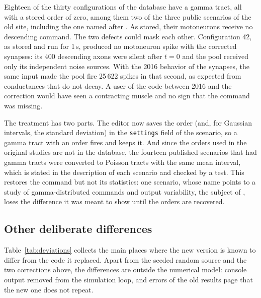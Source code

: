 \documentclass[pdflatex,sn-apa,iicol]{sn-jnl}
\providecommand{\code}[1]{\texttt{#1}}
\begin{document}
Eighteen of the thirty configurations of the database have a gamma tract, all with a stored order of zero, among them two of the three public scenarios of the old site, including the one named after \citet{Watanabe2015}. As stored, their motoneurons receive no descending command. The two defects could mask each other. Configuration 42, as stored and run for 1\,s, produced no motoneuron spike with the corrected synapses: its 400 descending axons were silent after $t = 0$ and the pool received only its independent noise sources. With the 2016 behavior of the synapses, the same input made the pool fire 25\,622 spikes in that second, as expected from conductances that do not decay. A user of the code between 2016 and the correction would have seen a contracting muscle and no sign that the command was missing.

The treatment has two parts. The editor now saves the order (and, for Gaussian intervals, the standard deviation) in the \code{settings} field of the scenario, so a gamma tract with an order fires and keeps it. And since the orders used in the original studies are not in the database, the fourteen published scenarios that had gamma tracts were converted to Poisson tracts with the same mean interval, which is stated in the description of each scenario and checked by a test. This restores the command but not its statistics: one scenario, whose name points to a study of gamma-distributed commands and output variability, the subject of \citet{Watanabe2013}, loses the difference it was meant to show until the orders are recovered.

\subsection{Other deliberate differences}\label{sec:deviations}

Table~\ref{tab:deviations} collects the main places where the new version is known to differ from the code it replaced. Apart from the seeded random source and the two corrections above, the differences are outside the numerical model: console output removed from the simulation loop, and errors of the old results page that the new one does not repeat.
\end{document}
